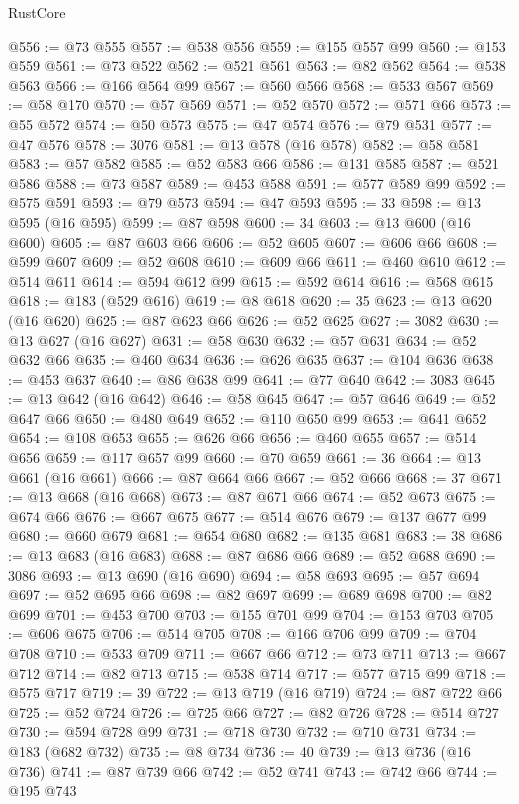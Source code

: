 \begin{lexlean}{RustCore}
\begin{coremodule}
@556 := @73 @555
@557 := @538 @556
@559 := @155 @557 @99
@560 := @153 @559
@561 := @73 @522
@562 := @521 @561
@563 := @82 @562
@564 := @538 @563
@566 := @166 @564 @99
@567 := @560 @566
@568 := @533 @567
@569 := @58 @170
@570 := @57 @569
@571 := @52 @570
@572 := @571 @66
@573 := @55 @572
@574 := @50 @573
@575 := @47 @574
@576 := @79 @531
@577 := @47 @576
@578 := 3076
@581 := @13 @578 (@16 @578)
@582 := @58 @581
@583 := @57 @582
@585 := @52 @583 @66
@586 := @131 @585
@587 := @521 @586
@588 := @73 @587
@589 := @453 @588
@591 := @577 @589 @99
@592 := @575 @591
@593 := @79 @573
@594 := @47 @593
@595 := 33
@598 := @13 @595 (@16 @595)
@599 := @87 @598
@600 := 34
@603 := @13 @600 (@16 @600)
@605 := @87 @603 @66
@606 := @52 @605
@607 := @606 @66
@608 := @599 @607
@609 := @52 @608
@610 := @609 @66
@611 := @460 @610
@612 := @514 @611
@614 := @594 @612 @99
@615 := @592 @614
@616 := @568 @615
@618 := @183 (@529 @616)
@619 := @8 @618
@620 := 35
@623 := @13 @620 (@16 @620)
@625 := @87 @623 @66
@626 := @52 @625
@627 := 3082
@630 := @13 @627 (@16 @627)
@631 := @58 @630
@632 := @57 @631
@634 := @52 @632 @66
@635 := @460 @634
@636 := @626 @635
@637 := @104 @636
@638 := @453 @637
@640 := @86 @638 @99
@641 := @77 @640
@642 := 3083
@645 := @13 @642 (@16 @642)
@646 := @58 @645
@647 := @57 @646
@649 := @52 @647 @66
@650 := @480 @649
@652 := @110 @650 @99
@653 := @641 @652
@654 := @108 @653
@655 := @626 @66
@656 := @460 @655
@657 := @514 @656
@659 := @117 @657 @99
@660 := @70 @659
@661 := 36
@664 := @13 @661 (@16 @661)
@666 := @87 @664 @66
@667 := @52 @666
@668 := 37
@671 := @13 @668 (@16 @668)
@673 := @87 @671 @66
@674 := @52 @673
@675 := @674 @66
@676 := @667 @675
@677 := @514 @676
@679 := @137 @677 @99
@680 := @660 @679
@681 := @654 @680
@682 := @135 @681
@683 := 38
@686 := @13 @683 (@16 @683)
@688 := @87 @686 @66
@689 := @52 @688
@690 := 3086
@693 := @13 @690 (@16 @690)
@694 := @58 @693
@695 := @57 @694
@697 := @52 @695 @66
@698 := @82 @697
@699 := @689 @698
@700 := @82 @699
@701 := @453 @700
@703 := @155 @701 @99
@704 := @153 @703
@705 := @606 @675
@706 := @514 @705
@708 := @166 @706 @99
@709 := @704 @708
@710 := @533 @709
@711 := @667 @66
@712 := @73 @711
@713 := @667 @712
@714 := @82 @713
@715 := @538 @714
@717 := @577 @715 @99
@718 := @575 @717
@719 := 39
@722 := @13 @719 (@16 @719)
@724 := @87 @722 @66
@725 := @52 @724
@726 := @725 @66
@727 := @82 @726
@728 := @514 @727
@730 := @594 @728 @99
@731 := @718 @730
@732 := @710 @731
@734 := @183 (@682 @732)
@735 := @8 @734
@736 := 40
@739 := @13 @736 (@16 @736)
@741 := @87 @739 @66
@742 := @52 @741
@743 := @742 @66
@744 := @195 @743

\end{coremodule}
\end{lexlean}
